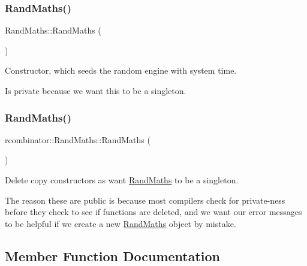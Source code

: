 \subsubsection{\texorpdfstring{Rand\+Maths()}{RandMaths()}\hspace{0.1cm}{\footnotesize\ttfamily [1/2]}}
{\footnotesize\ttfamily Rand\+Maths\+::\+Rand\+Maths (\begin{DoxyParamCaption}{ }\end{DoxyParamCaption})\hspace{0.3cm}{\ttfamily [private]}}



Constructor, which seeds the random engine with system time. 

Is private because we want this to be a singleton. \mbox{\label{classrcombinator_1_1RandMaths_ac9b350a4aa07b739dcc2bb12c3b5c0e5}} 
\subsubsection{\texorpdfstring{Rand\+Maths()}{RandMaths()}\hspace{0.1cm}{\footnotesize\ttfamily [2/2]}}
{\footnotesize\ttfamily rcombinator\+::\+Rand\+Maths\+::\+Rand\+Maths (\begin{DoxyParamCaption}\item[{\mbox{\hyperlink{classrcombinator_1_1RandMaths}{Rand\+Maths}} const \&}]{ }\end{DoxyParamCaption})\hspace{0.3cm}{\ttfamily [delete]}}



Delete copy constructors as want \mbox{\hyperlink{classrcombinator_1_1RandMaths}{Rand\+Maths}} to be a singleton. 

The reason these are public is because most compilers check for private-\/ness before they check to see if functions are deleted, and we want our error messages to be helpful if we create a new \mbox{\hyperlink{classrcombinator_1_1RandMaths}{Rand\+Maths}} object by mistake. 

\subsection{Member Function Documentation}
\mbox{\label{classrcombinator_1_1RandMaths_a3834f9a074546f0d588247610f16fb0e}} 
